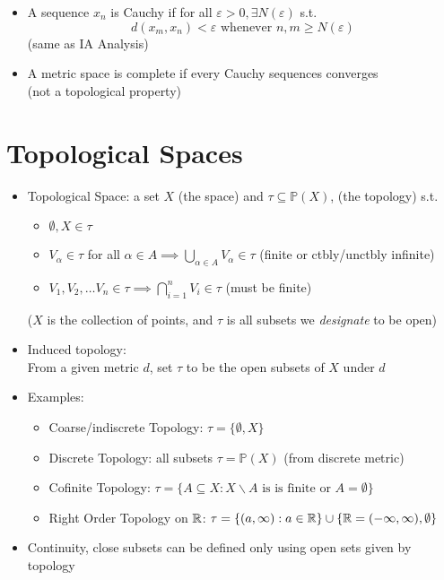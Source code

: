 \begin{itemize}
    \item A sequence $x_n$ is Cauchy if for all $\varepsilon > 0, \exists N(\varepsilon)$ s.t. \[d(x_m, x_n) < \varepsilon \text{ whenever } n, m \geq N(\varepsilon) \]
          (same as IA Analysis)
    \item A metric space is complete if every Cauchy sequences converges \\ (not a topological property)

\end{itemize}

\section{Topological Spaces}

\begin{itemize}
    \item Topological Space: a set $X$ (the space) and $\tau \subseteq \mathbb{P}(X)$, (the topology) s.t.
          \begin{itemize}
              \item $\emptyset, X \in \tau$
              \item $V_\alpha \in \tau$ for all $\alpha \in A \implies \bigcup_{\alpha \in A} V_\alpha \in \tau $ \quad (finite or ctbly/unctbly infinite)
              \item $V_1, V_2, \dots V_n \in \tau \implies \bigcap_{i=1}^n V_i \in \tau$ \qquad (must be finite)
          \end{itemize}
          ($X$ is the collection of points, and $\tau$ is all subsets we \emph{designate} to be open)
    \item Induced topology: \\ From a given metric $d$, set $\tau$ to be the open subsets of $X$ under $d$
    \item Examples:
          \begin{itemize}
              \item Coarse/indiscrete Topology: $\tau = \{\emptyset, X\}$
              \item Discrete Topology: all subsets $\tau =\mathbb{P}(X)$ (from discrete metric)
              \item Cofinite Topology: $\tau = \{A \subseteq X : X \backslash A \text{ is is finite or } A = \emptyset \}$
              \item Right Order Topology on $\mathbb{R}$: $\tau = \{(a,\infty) : a \in \mathbb{R} \} \cup \{\mathbb{R} = (-\infty, \infty), \emptyset\}$
          \end{itemize}
    \item Continuity, close subsets can be defined only using open sets given by topology
\end{itemize}

